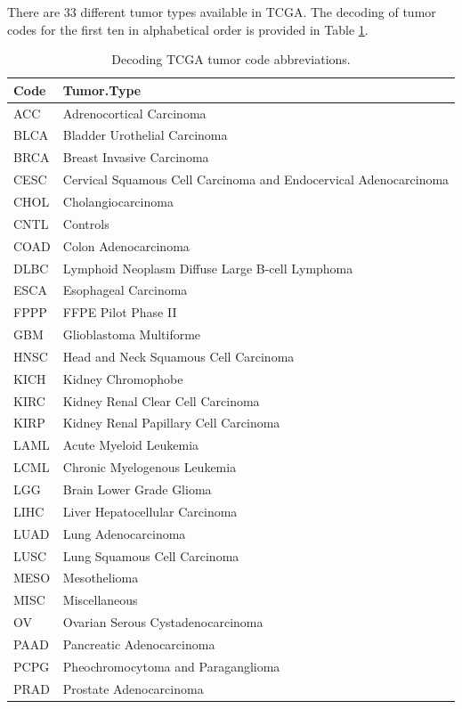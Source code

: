 There are 33 different tumor types available in TCGA. The
decoding of tumor codes for the first ten in alphabetical order is
provided in Table \ref{tab:tab-deco}.

\begin{table}

\caption{\label{tab:tab-deco}Decoding TCGA tumor code abbreviations.}
\centering
\begin{tabular}[t]{ll}
\toprule
Code & Tumor.Type\\
\midrule
ACC & Adrenocortical Carcinoma\\
BLCA & Bladder Urothelial Carcinoma\\
BRCA & Breast Invasive Carcinoma\\
CESC & Cervical Squamous Cell Carcinoma and Endocervical Adenocarcinoma\\
CHOL & Cholangiocarcinoma\\
\addlinespace
CNTL & Controls\\
COAD & Colon Adenocarcinoma\\
DLBC & Lymphoid Neoplasm Diffuse Large B-cell Lymphoma\\
ESCA & Esophageal Carcinoma\\
FPPP & FFPE Pilot Phase II\\
\addlinespace
GBM & Glioblastoma Multiforme\\
HNSC & Head and Neck Squamous Cell Carcinoma\\
KICH & Kidney Chromophobe\\
KIRC & Kidney Renal Clear Cell Carcinoma\\
KIRP & Kidney Renal Papillary Cell Carcinoma\\
\addlinespace
LAML & Acute Myeloid Leukemia\\
LCML & Chronic Myelogenous Leukemia\\
LGG & Brain Lower Grade Glioma\\
LIHC & Liver Hepatocellular Carcinoma\\
LUAD & Lung Adenocarcinoma\\
\addlinespace
LUSC & Lung Squamous Cell Carcinoma\\
MESO & Mesothelioma\\
MISC & Miscellaneous\\
OV & Ovarian Serous Cystadenocarcinoma\\
PAAD & Pancreatic Adenocarcinoma\\
\addlinespace
PCPG & Pheochromocytoma and Paraganglioma\\
PRAD & Prostate Adenocarcinoma\\

\end{tabular}
\end{table}
